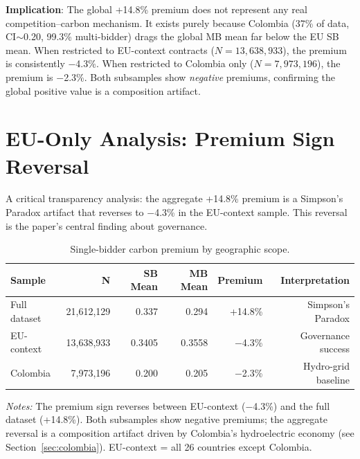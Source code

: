 \documentclass[11pt]{article}
\newcommand{\tabnoteblock}[1]{%
    \par\vspace{0.45em}%
    \begin{minipage}{0.98\linewidth}
    \footnotesize\raggedright #1
    \end{minipage}\par
}
\newcommand{\tabnotes}[1]{\tabnoteblock{\textit{Notes:} #1}}
\begin{document}
\textbf{Implication}: The global +14.8\% premium does not represent any real competition--carbon mechanism. It exists purely because Colombia (37\% of data, CI$\sim$0.20, 99.3\% multi-bidder) drags the global MB mean far below the EU SB mean. When restricted to EU-context contracts ($N = 13{,}638{,}933$), the premium is consistently $-$4.3\%. When restricted to Colombia only ($N = 7{,}973{,}196$), the premium is $-$2.3\%. Both subsamples show \textit{negative} premiums, confirming the global positive value is a composition artifact.

\section{EU-Only Analysis: Premium Sign Reversal}

A critical transparency analysis: the aggregate +14.8\% premium is a Simpson's Paradox artifact that reverses to $-$4.3\% in the EU-context sample. This reversal is the paper's central finding about governance.

\begin{table}[H]
\centering
\caption{Single-bidder carbon premium by geographic scope.}
\label{tab:eu_vs_full}
\begin{tabular}{lrrrrr}
\toprule
\textbf{Sample} & \textbf{N} & \textbf{SB Mean} & \textbf{MB Mean} & \textbf{Premium} & \textbf{Interpretation} \\
\midrule
Full dataset & 21,612,129 & 0.337 & 0.294 & +14.8\% & Simpson's Paradox \\
EU-context & 13,638,933 & 0.3405 & 0.3558 & $-$4.3\% & Governance success \\
Colombia & 7,973,196 & 0.200 & 0.205 & $-$2.3\% & Hydro-grid baseline \\
\bottomrule
\end{tabular}

\tabnotes{The premium sign reverses between EU-context ($-$4.3\%) and the full dataset (+14.8\%). Both subsamples show negative premiums; the aggregate reversal is a composition artifact driven by Colombia's hydroelectric economy (see Section~\ref{sec:colombia}). EU-context = all 26 countries except Colombia.
}
\end{table}
\end{document}
